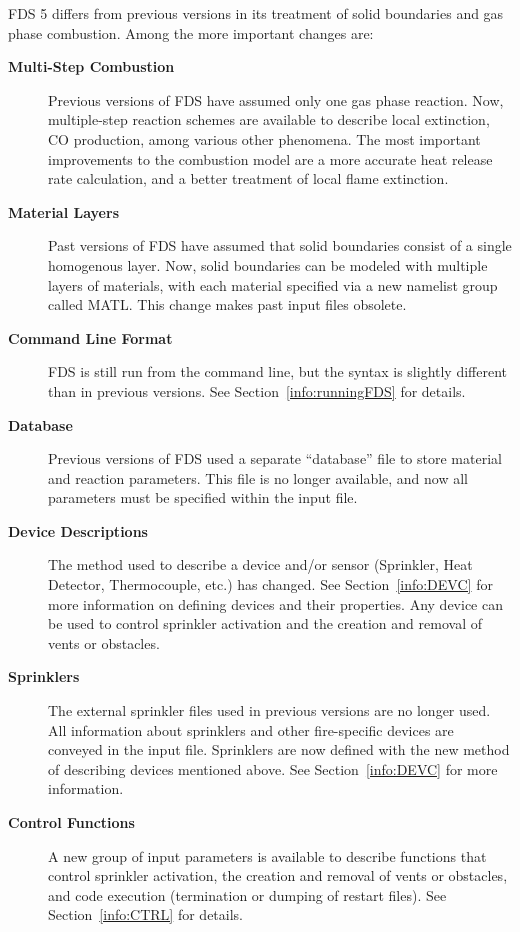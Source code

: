 \documentclass[11pt]{book}
\begin{document}
FDS 5 differs from previous versions in its treatment of solid boundaries and
gas phase combustion. Among the more important changes are:
\begin{description}
\item[{\bf Multi-Step Combustion}] Previous versions of FDS have assumed only one gas
phase reaction. Now, multiple-step reaction schemes are available to describe local
extinction, CO production, among various other phenomena. The most important improvements to the combustion model are a more
accurate heat release rate calculation, and a better treatment of local flame extinction.

\item[{\bf Material Layers}] Past versions of FDS have assumed that solid boundaries
consist of a single homogenous layer. Now, solid boundaries can be modeled with
multiple layers of materials, with each material specified via a new namelist
group called {\ct MATL}. This change makes past input files obsolete.

\item[{\bf Command Line Format}] FDS is still run from the command line, but the syntax
is slightly different than in previous versions. See Section~\ref{info:runningFDS} for
details.

\item[{\bf Database}] Previous versions of FDS used a separate ``database'' file to store
material and reaction parameters. This file is no longer available, and now all
parameters must be specified within the input file.

\item[{\bf Device Descriptions}] The method used to describe a device and/or sensor
(Sprinkler, Heat Detector, Thermocouple, etc.) has changed.  See Section~\ref{info:DEVC}
for more information on defining devices and their properties.  Any device can be used to control
sprinkler activation and the creation and removal of vents or obstacles.

\item[{\bf Sprinklers}] The external sprinkler files used in previous versions
are no longer used. All information about sprinklers and other fire-specific devices are
conveyed in the input file.  Sprinklers are now defined with the new method of describing
devices mentioned above.  See Section~\ref{info:DEVC} for more information.

\item[{\bf Control Functions}] A new group of input parameters is available to describe functions
that control sprinkler activation, the creation and removal of vents or obstacles,
and code execution (termination or dumping of restart files). See Section~\ref{info:CTRL} for details.


\end{description}
\end{document}
